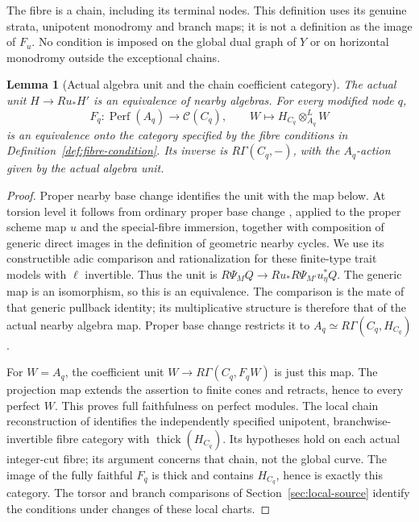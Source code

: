 \documentclass[11pt]{article}
\newtheorem{lemma}[theorem]{Lemma}
\theoremstyle{definition}
\theoremstyle{remark}
\newcommand{\Perf}{\operatorname{Perf}}
\begin{document}
The fibre is a chain, including its terminal nodes.  This definition
uses its genuine strata, unipotent monodromy and branch maps; it is
not a definition as the image of $F_u$.  No condition is imposed on
the global dual graph of $Y$ or on horizontal monodromy outside the
exceptional chains.

\begin{lemma}[Actual algebra unit and the chain coefficient category]
\label{lem:curve-unit}
The actual unit $H\to Ru_*H'$ is an equivalence of nearby algebras.
For every modified node $q$,
\[
 F_q:\Perf(A_q)\longrightarrow\mathcal C(C_q),\qquad
 W\longmapsto H_{C_q}\otimes^L_{A_q}W
\]
is an equivalence onto the category specified by the fibre conditions
in Definition~\ref{def:fibre-condition}.  Its inverse is $R\Gamma(C_q,-)$,
with the $A_q$-action given by the actual algebra unit.
\end{lemma}
\begin{proof}
Proper nearby base change identifies the unit with the map below.
At torsion level it follows from ordinary proper base change
\cite[Expose XII, Theorem 5.1]{SGA4}, applied to the proper scheme
map $u$ and the special-fibre immersion, together with composition
of generic direct images in the definition of geometric nearby
cycles. We use its constructible adic comparison and rationalization
\cite{LZEnhanced,LZAdic} for these finite-type trait models with
$\ell$ invertible. Thus the unit is
$R\Psi_MQ\to Ru_*R\Psi_{M'}u_\eta^*Q$.
The generic map is an isomorphism, so this is an equivalence.
The comparison is the mate of that generic pullback identity;
its multiplicative structure is therefore that of the actual nearby
algebra map.  Proper base change restricts it to
$A_q\simeq R\Gamma(C_q,H_{C_q})$.

For $W=A_q$, the coefficient unit
$W\to R\Gamma(C_q,F_qW)$ is just this map.  The projection map
extends the assertion to finite cones and retracts, hence to every
perfect $W$.  This proves full faithfulness on perfect modules.
The local chain reconstruction of
\cite[\texttt{thm:cell-reconstruction}]{Refinement} identifies the
independently specified unipotent, branchwise-invertible fibre
category with $\operatorname{thick}(H_{C_q})$.  Its hypotheses hold
on each actual integer-cut fibre; its argument concerns that chain,
not the global curve.  The image of the fully faithful $F_q$ is
thick and contains $H_{C_q}$, hence is exactly this category.
The torsor and branch comparisons of Section~\ref{sec:local-source}
identify the conditions under changes of these local charts.
\end{proof}
\end{document}
